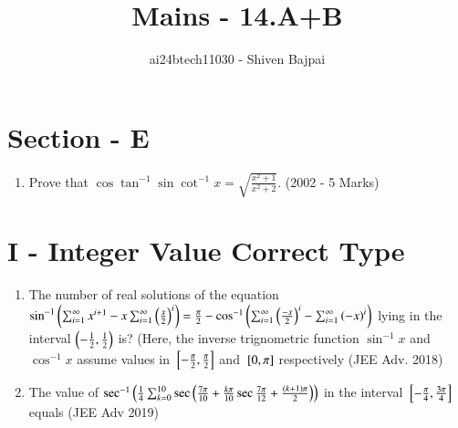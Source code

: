 \documentclass[journal,12pt,twocolumn]{IEEEtran}
\theoremstyle{remark}
\begin{document}

\vspace{3cm}

\title{Mains - 14.A+B}
\author{ai24btech11030 - Shiven Bajpai}
\maketitle
\newpage
\bigskip

\renewcommand{\thefigure}{\theenumi}
\renewcommand{\thetable}{\theenumi}

\section*{Section - E}
\begin{enumerate}
	\item{
			Prove that $\cos \tan^{-1} \sin \cot^{-1} x = \sqrt{\frac{x^2 + 1}{x^2 + 2}}$. \hfill (2002 - 5 Marks)
		}
\end{enumerate}

\section*{I - Integer Value Correct Type}
\begin{enumerate}
	\item{
			The number of real solutions of the equation $\sin ^{-1}\left(\sum_{i=1}^{\infty} x^{i+1}-x \sum_{i=1}^{\infty} \left(\frac{x}{2}\right)^i\right) = \frac{\pi}{2} - \cos^{-1}\left(\sum_{i=1}^{\infty}\left(\frac{-x}{2}\right)^i-\sum_{i=1}^{\infty} \left(-x\right)^i\right)$ lying in the interval $\left(-\frac{1}{2},\frac{1}{2}\right)$ is? (Here, the inverse trignometric function $\sin^{-1}x$ and $\cos^{-1}x$ assume values in ${}\left[-\frac{\pi}{2}, \frac{\pi}{2}\right]$ and ${}\left[0, \pi\right]$ respectively \hfill (JEE Adv. 2018)
}

\item{
		The value of $\sec^{-1}\left(\frac{1}{4}\sum_{k=0}^{10} \sec\left(\frac{7\pi}{10}+\frac{k\pi}{10} \sec{\frac{7\pi}{12}+\frac{\ensuremath{\left(k+1\right)}\pi}{2}}\right)\right)$ in the interval ${}\left[-\frac{\pi}{4},\frac{3\pi}{4}\right]$ equals \hfill (JEE Adv 2019)	
	}
\end{enumerate}
\end{document}
